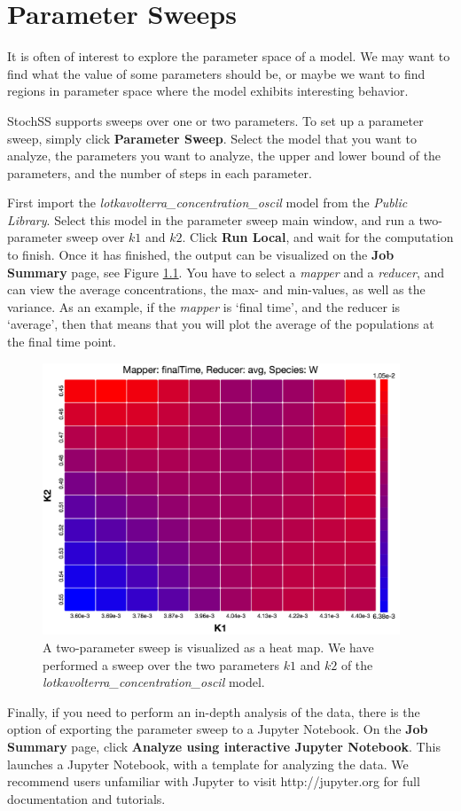 
\chapter{Parameter Sweeps}

It is often of interest to explore the parameter space of a model. We may want to find what the value of some parameters should be, or maybe we want to find regions in parameter space where the model exhibits interesting behavior.

StochSS supports sweeps over one or two parameters. To set up a parameter sweep, simply click \textbf{Parameter Sweep}. Select the model that you want to analyze, the parameters you want to analyze, the upper and lower bound of the parameters, and the number of steps in each parameter.

First import the \emph{lotkavolterra\_concentration\_oscil} model from the \emph{Public Library}. Select this model in the parameter sweep main window, and run a two-parameter sweep over $k1$ and $k2$. Click \textbf{Run Local}, and wait for the computation to finish. Once it has finished, the output can be visualized on the \textbf{Job Summary} page, see Figure \ref{psweep-fig1}. You have to select a \emph{mapper} and a \emph{reducer}, and can view the average concentrations, the max- and min-values, as well as the variance. As an example, if the \emph{mapper} is `final time', and the reducer is `average', then that means that you will plot the average of the populations at the final time point.
\begin{figure}[!ht]
\centering
\includegraphics[width=0.95\textwidth]{Psweep/heatmap.png}
\caption{\label{psweep-fig1}A two-parameter sweep is visualized as a heat map. We have performed a sweep over the two parameters $k1$ and $k2$ of the \emph{lotkavolterra\_concentration\_oscil} model. }
\end{figure}

Finally, if you need to perform an in-depth analysis of the data, there is the option of exporting the parameter sweep to a Jupyter Notebook. On the \textbf{Job Summary} page, click \textbf{Analyze using interactive Jupyter Notebook}. This launches a Jupyter Notebook, with a template for analyzing the data. We recommend users unfamiliar with Jupyter to visit http://jupyter.org for full documentation and tutorials.

